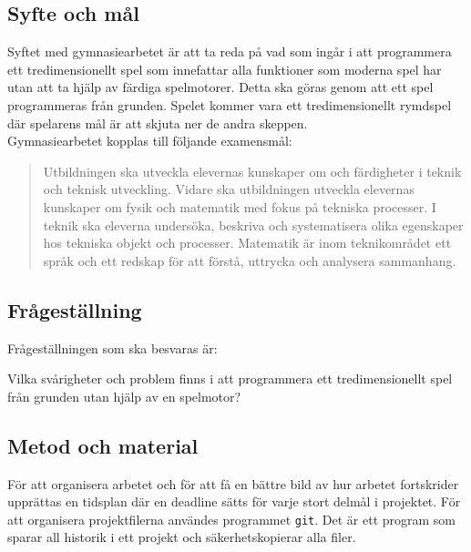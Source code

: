 \documentclass[12pt, a4paper]{article}
\newcommand{\code}{\texttt}
\begin{document}
	\subsection{Syfte och mål}
	
	Syftet med gymnasiearbetet är att ta reda på vad som ingår i att programmera ett tredimensionellt spel som innefattar alla funktioner som moderna spel har utan att ta hjälp av färdiga spelmotorer. Detta ska göras genom att ett spel programmeras från grunden. Spelet kommer vara ett tredimensionellt rymdspel där spelarens mål är att skjuta ner de andra skeppen. \\
	
	\noindent Gymnasiearbetet kopplas till följande examensmål:
	
	\begin{quote} \small
		Utbildningen ska utveckla elevernas kunskaper om och färdigheter i teknik och teknisk utveckling. Vidare ska utbildningen utveckla elevernas kunskaper om fysik och matematik med fokus på tekniska processer. I teknik ska eleverna undersöka, beskriva och systematisera olika egenskaper hos tekniska objekt och processer. Matematik är inom teknikområdet ett språk och ett redskap för att förstå, uttrycka och analysera sammanhang. 
	\end{quote}
	
	\subsection{Frågeställning}
	
	Frågeställningen som ska besvaras är: 

	\begin{center}
		Vilka svårigheter och problem finns i att programmera ett tredimensionellt spel från grunden utan hjälp av en spelmotor?
	\end{center}
	
	\subsection{Metod och material}
	
	För att organisera arbetet och för att få en bättre bild av hur arbetet fortskrider upprättas en tidsplan där en deadline sätts för varje stort delmål i projektet. För att organisera projektfilerna användes programmet \code{git}. Det är ett program som sparar all historik i ett projekt och säkerhetskopierar alla filer. 
	
\end{document}
